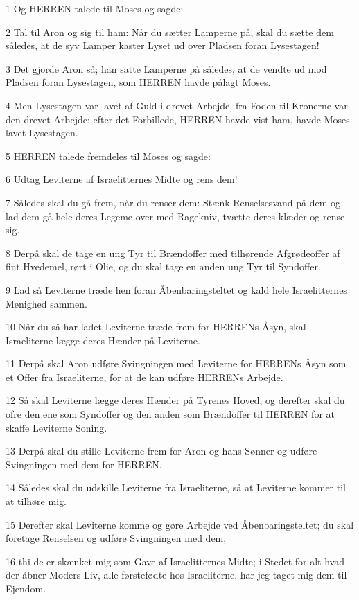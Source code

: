 \par 1 Og HERREN talede til Moses og sagde:
\par 2 Tal til Aron og sig til ham: Når du sætter Lamperne på, skal du sætte dem således, at de syv Lamper kaster Lyset ud over Pladsen foran Lysestagen!
\par 3 Det gjorde Aron så; han satte Lamperne på således, at de vendte ud mod Pladsen foran Lysestagen, som HERREN havde pålagt Moses.
\par 4 Men Lysestagen var lavet af Guld i drevet Arbejde, fra Foden til Kronerne var den drevet Arbejde; efter det Forbillede, HERREN havde vist ham, havde Moses lavet Lysestagen.
\par 5 HERREN talede fremdeles til Moses og sagde:
\par 6 Udtag Leviterne af Israelitternes Midte og rens dem!
\par 7 Således skal du gå frem, når du renser dem: Stænk Renselsesvand på dem og lad dem gå hele deres Legeme over med Ragekniv, tvætte deres klæder og rense sig.
\par 8 Derpå skal de tage en ung Tyr til Brændoffer med tilhørende Afgrødeoffer af fint Hvedemel, rørt i Olie, og du skal tage en anden ung Tyr til Syndoffer.
\par 9 Lad så Leviterne træde hen foran Åbenbaringsteltet og kald hele Israelitternes Menighed sammen.
\par 10 Når du så har ladet Leviterne træde frem for HERRENs Åsyn, skal Israeliterne lægge deres Hænder på Leviterne.
\par 11 Derpå skal Aron udføre Svingningen med Leviterne for HERRENs Åsyn som et Offer fra Israeliterne, for at de kan udføre HERRENs Arbejde.
\par 12 Så skal Leviterne lægge deres Hænder på Tyrenes Hoved, og derefter skal du ofre den ene som Syndoffer og den anden som Brændoffer til HERREN for at skaffe Leviterne Soning.
\par 13 Derpå skal du stille Leviterne frem for Aron og hans Sønner og udføre Svingningen med dem for HERREN.
\par 14 Således skal du udskille Leviterne fra Israeliterne, så at Leviterne kommer til at tilhøre mig.
\par 15 Derefter skal Leviterne komme og gøre Arbejde ved Åbenbaringsteltet; du skal foretage Renselsen og udføre Svingningen med dem,
\par 16 thi de er skænket mig som Gave af Israelitternes Midte; i Stedet for alt hvad der åbner Moders Liv, alle førstefødte hos Israeliterne, har jeg taget mig dem til Ejendom.
